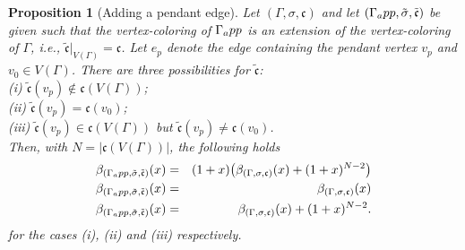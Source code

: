 \documentclass[10pt,a4paper]{amsart}
\newtheorem{prop}{Proposition}
\newcommand{\hf}{\hspace*{0.5cm}}
\begin{document}
\begin{prop}[Adding a pendant edge]\label{prop:Gamma-app}
Let $(\Gamma,\sigma,\mathfrak{c})$ and let $(\Gamma_\textup{app},\tilde{\sigma}, \tilde{\mathfrak{c}})$ be given such that the vertex-coloring of $\Gamma_\textup{app}$ is an extension of the vertex-coloring of $\Gamma$, i.e., $\tilde{\mathfrak{c}}|_{V(\Gamma)}=\mathfrak{c}$. Let $e_p$ denote the edge containing the pendant vertex $v_p$ and $v_0\in V(\Gamma)$. There are three possibilities for $\tilde{\mathfrak{c}}$:\\
\hf (i) $\tilde{\mathfrak{c}}(v_p)\not\in \mathfrak{c}(V(\Gamma))$;\\
\hf (ii) $\tilde{\mathfrak{c}}(v_p)=\mathfrak{c}(v_0)$;\\
\hf (iii) $\tilde{\mathfrak{c}}(v_p)\in \mathfrak{c}(V(\Gamma))$ but $\tilde{\mathfrak{c}}(v_p)\neq \mathfrak{c}(v_0)$.\\
Then, with $N=|\mathfrak{c}(V(\Gamma))|$, the following holds
\begin{eqnarray}
  {\beta}_{(\Gamma_\textup{app},\tilde{\sigma},\tilde{\mathfrak{c}})}(x) & = & (1+x)\big({\beta}_{(\Gamma,\sigma,\mathfrak{c})}(x)+(1+x)^{N-2}\big) \label{eqn:pen-new-color}\\
  {\beta}_{(\Gamma_\textup{app},\tilde{\sigma},\tilde{\mathfrak{c}})}(x) & = & {\beta}_{(\Gamma,\sigma,\mathfrak{c})}(x) \label{eqn:pen-same-color}\\
  {\beta}_{(\Gamma_\textup{app},\tilde{\sigma},\tilde{\mathfrak{c}})}(x) & = & {\beta}_{(\Gamma,\sigma,\mathfrak{c})}(x)+(1+x)^{N-2}. \label{eqn:pen-same-non-adj-color}
\end{eqnarray}
for the cases (i), (ii) and (iii) respectively.
\end{prop}
\end{document}
